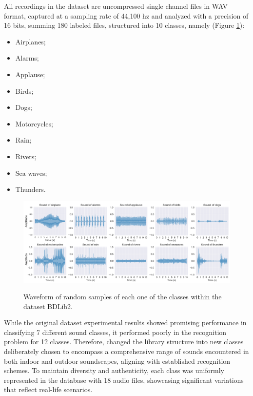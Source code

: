 All recordings in the dataset are uncompressed single channel files in WAV format, captured at a sampling rate of 44,100 \gls{hz} and analyzed with a precision of 16 bits, summing 180 labeled files, structured into 10 classes, namely (Figure \ref{fig:methods_dataset_BDLib2}):
\begin{itemize}
    \item Airplanes;
    \item Alarms;
    \item Applause;
    \item Birds;
    \item Dogs; 
    \item Motorcycles;
    \item Rain;
    \item Rivers;
    \item Sea waves;
    \item Thunders. 
\end{itemize}

\begin{figure}[htbp]
    \raggedright
        \caption{Waveform of random samples of each one of the classes within the dataset BDLib2.}
        \includegraphics[width=1\textwidth]{resources/images/050-methods/Methods_dataset_BDLib2.png}
        \label{fig:methods_dataset_BDLib2}
\end{figure}

While the original dataset experimental results \cite{Bountourakis2015} showed promising performance in classifying 7 different sound classes, it performed poorly in the recognition problem for 12 classes. Therefore, \textcite{Bountourakis2019} changed the library structure into new classes deliberately chosen to encompass a comprehensive range of sounds encountered in both indoor and outdoor soundscapes, aligning with established recognition schemes. To maintain diversity and authenticity, each class was uniformly represented in the database with 18 audio files, showcasing significant variations that reflect real-life scenarios.

